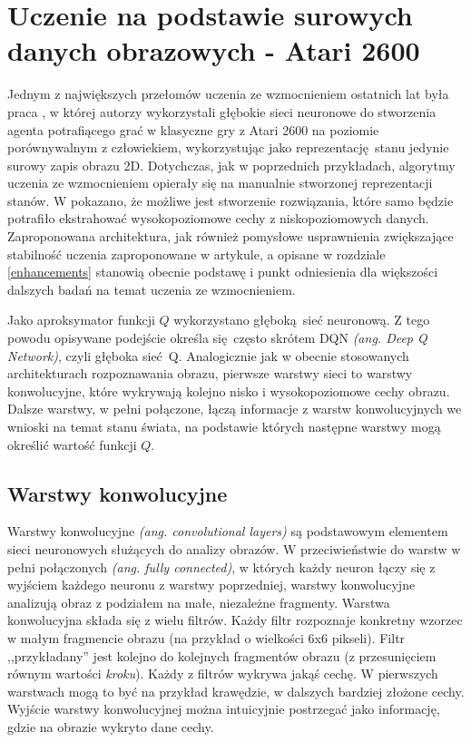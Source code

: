 \section{Uczenie na podstawie surowych danych obrazowych - Atari 2600}

Jednym z największych przełomów uczenia ze wzmocnieniem ostatnich lat była praca \break \cite{mnih2015human}, w której autorzy wykorzystali głębokie sieci neuronowe do stworzenia agenta potrafiącego grać w klasyczne gry z Atari 2600 na poziomie porównywalnym z człowiekiem, wykorzystując jako reprezentację stanu jedynie surowy zapis obrazu 2D. Dotychczas, jak w poprzednich przykładach, algorytmy uczenia ze wzmocnieniem opierały się na manualnie stworzonej reprezentacji stanów. W \cite{mnih2015human} pokazano, że możliwe jest stworzenie rozwiązania, które samo będzie potrafiło ekstrahować wysokopoziomowe cechy z niskopoziomowych danych. Zaproponowana architektura, jak również pomysłowe usprawnienia zwiększające stabilność uczenia zaproponowane w artykule, a opisane w rozdziale \ref {enhancements} stanowią obecnie podstawę i punkt odniesienia dla większości dalszych badań na temat uczenia ze wzmocnieniem.

Jako aproksymator funkcji $Q$ wykorzystano głęboką sieć neuronową. Z tego powodu opisywane podejście określa się często skrótem DQN \textit{(ang. Deep Q Network)}, czyli głęboka sieć Q. Analogicznie jak w obecnie stosowanych architekturach rozpoznawania obrazu, pierwsze warstwy sieci to warstwy konwolucyjne, które wykrywają kolejno nisko i wysokopoziomowe cechy obrazu. Dalsze warstwy, w pełni połączone, łączą informacje z warstw konwolucyjnych we wnioski na temat stanu świata, na podstawie których następne warstwy mogą określić wartość funkcji $Q$.

\subsection{Warstwy konwolucyjne}
Warstwy konwolucyjne \textit{(ang. convolutional layers)} są podstawowym elementem sieci neuronowych służących do analizy obrazów. W przeciwieństwie do warstw w pełni połączonych \textit{(ang. fully connected)}, w których każdy neuron łączy się z wyjściem każdego neuronu z warstwy poprzedniej, warstwy konwolucyjne analizują obraz z podziałem na małe, niezależne fragmenty. Warstwa konwolucyjna składa się z wielu filtrów. Każdy filtr rozpoznaje konkretny wzorzec w małym fragmencie obrazu (na przykład o wielkości 6x6 pikseli). Filtr ,,przykładany'' jest kolejno do kolejnych fragmentów obrazu (z przesunięciem równym wartości \textit{kroku}). Każdy z filtrów wykrywa jakąś cechę. W pierwszych warstwach mogą to być na przykład krawędzie, w dalszych bardziej złożone cechy. Wyjście warstwy konwolucyjnej można intuicyjnie postrzegać jako informację, gdzie na obrazie wykryto dane cechy.


